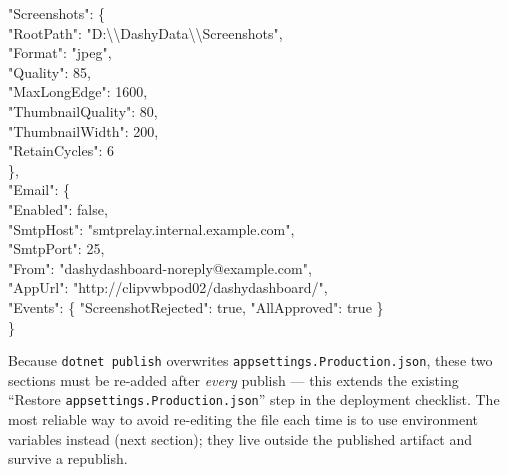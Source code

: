 \documentclass[12pt,a4paper]{report}
\begin{document}
\begin{codebox}
\ttfamily\small
"Screenshots": \{\\
\hspace*{2em}"RootPath": "D:\textbackslash\textbackslash DashyData\textbackslash\textbackslash Screenshots",\\
\hspace*{2em}"Format": "jpeg",\\
\hspace*{2em}"Quality": 85,\\
\hspace*{2em}"MaxLongEdge": 1600,\\
\hspace*{2em}"ThumbnailQuality": 80,\\
\hspace*{2em}"ThumbnailWidth": 200,\\
\hspace*{2em}"RetainCycles": 6\\
\},\\
"Email": \{\\
\hspace*{2em}"Enabled": false,\\
\hspace*{2em}"SmtpHost": "smtprelay.internal.example.com",\\
\hspace*{2em}"SmtpPort": 25,\\
\hspace*{2em}"From": "dashydashboard-noreply@example.com",\\
\hspace*{2em}"AppUrl": "http://clipvwbpod02/dashydashboard/",\\
\hspace*{2em}"Events": \{ "ScreenshotRejected": true, "AllApproved": true \}\\
\}
\end{codebox}

\begin{warnbox}
Because \texttt{dotnet publish} overwrites \texttt{appsettings.Production.json}, these two sections
must be re-added after \emph{every} publish --- this extends the existing
``Restore \texttt{appsettings.Production.json}'' step in the deployment checklist. The most reliable
way to avoid re-editing the file each time is to use environment variables instead (next section);
they live outside the published artifact and survive a republish.
\end{warnbox}
\end{document}
